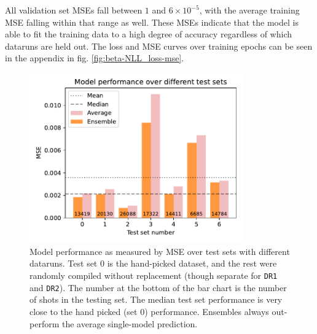 All validation set MSEs fall between $1$ and $6 \times 10^{-5}$, with the average training MSE falling within that range as well. These MSEs indicate that the model is able to fit the training data to a high degree of accuracy regardless of which dataruns are held out. The loss and MSE curves over training epochs can be seen in the appendix in fig. \ref{fig:beta-NLL_loss-mse}.


\begin{figure}
	\centering
	\includegraphics[width=260pt]{figures/cv-beta-NLL-valid-mse.pdf}
	\caption[Cross-validation test set error]{\label{fig:cv-beta-NLL-test-mse}Model performance as measured by MSE over test sets with different dataruns. Test set 0 is the hand-picked dataset, and the rest were randomly compiled without replacement (though separate for \texttt{DR1} and \texttt{DR2}). The number at the bottom of the bar chart is the number of shots in the testing set. The median test set performance is very close to the hand picked (set 0) performance. Ensembles always out-perform the average single-model prediction.}
\end{figure}

